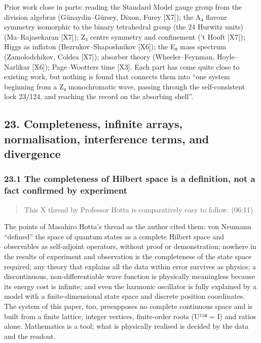 \documentclass[
  a4paper,
]{article}
\begin{document}
Prior work close in parts: reading the Standard Model gauge group from
the division algebras (Günaydin--Gürsey, Dixon, Furey {[}X7{]}); the A₄
flavour symmetry isomorphic to the binary tetrahedral group (the 24
Hurwitz units) (Ma--Rajasekaran {[}X7{]}); Z₃ centre symmetry and
confinement ('t Hooft {[}X7{]}); Higgs as inflaton
(Bezrukov--Shaposhnikov {[}X6{]}); the E₈ mass spectrum (Zamolodchikov,
Coldea {[}X7{]}); absorber theory (Wheeler--Feynman, Hoyle--Narlikar
{[}X6{]}); Page--Wootters time {[}X3{]}. Each part has come quite close
to existing work, but nothing is found that connects them into ``one
system beginning from a Z₄ monochromatic wave, passing through the
self-consistent lock 23/124, and reaching the record on the absorbing
shell''.

\subsection{23. Completeness, infinite arrays, normalisation,
interference terms, and
divergence}\label{completeness-infinite-arrays-normalisation-interference-terms-and-divergence}

\subsubsection{23.1 The completeness of Hilbert space is a definition,
not a fact confirmed by
experiment}\label{the-completeness-of-hilbert-space-is-a-definition-not-a-fact-confirmed-by-experiment}

\begin{quote}
This X thread by Professor Hotta is comparatively easy to follow.
(06:11)
\end{quote}

The points of Masahiro Hotta's thread as the author cited them: von
Neumann ``defined'' the space of quantum states as a complete Hilbert
space and observables as self-adjoint operators, without proof or
demonstration; nowhere in the results of experiment and observation is
the completeness of the state space required; any theory that explains
all the data within error survives as physics; a discontinuous,
non-differentiable wave function is physically meaningless because its
energy cost is infinite; and even the harmonic oscillator is fully
explained by a model with a finite-dimensional state space and discrete
position coordinates. The system of this paper, too, presupposes no
complete continuous space and is built from a finite lattice, integer
vertices, finite-order roots (U¹²⁴ = I) and ratios alone. Mathematics is
a tool; what is physically realised is decided by the data and the
readout.
\end{document}
